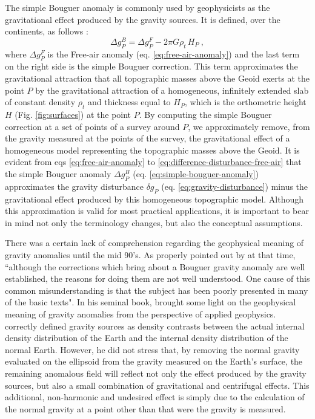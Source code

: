 \documentclass[extra]{gji}
\begin{document}
The simple Bouguer anomaly is commonly used by geophysicists as the
gravitational effect produced by the gravity sources.
It is defined, over the continents, as follows
\citep{blakely1996, hofmann-wellenhof-moritz2005}:
\begin{equation}
\Delta g_{P}^{B}
= \Delta g_{P}^{F} - 2 \pi G \rho_{t} \, H_{P} \: ,
\label{eq:simple-bouguer-anomaly}
\end{equation}
where $\Delta g_{P}^{F}$ is the Free-air anomaly (eq. \ref{eq:free-air-anomaly})
and the last term on the right side is the simple Bouguer correction.
This term approximates the gravitational attraction that all topographic
masses above the Geoid exerts at the point $P$ by the gravitational
attraction of a homogeneous, infinitely extended slab of
constant density $\rho_{t}$ and thickness equal to $H_{P}$, which is
the orthometric height $H$ (Fig. \ref{fig:surfaces}) at the point $P$.
By computing the simple Bouguer correction at a set of points
of a survey around $P$, we approximately remove,
from the gravity measured at the points of the survey,
the gravitational effect of a homogeneous model representing
the topographic masses above the Geoid.
It is evident from eqs
\ref{eq:free-air-anomaly} to \ref{eq:difference-disturbance-free-air}
that the simple Bouguer anomaly $\Delta g_{P}^{B}$ (eq.
\ref{eq:simple-bouguer-anomaly}) approximates the gravity disturbance
$\delta g_{P}$ (eq. \ref{eq:gravity-disturbance})
minus the gravitational effect produced by this homogeneous topographic
model.
Although this approximation is valid for most practical applications,
it is important to bear in mind not only the terminology
changes, but also the conceptual assumptions.

There was a certain lack of comprehension regarding the
geophysical meaning of gravity anomalies until the
mid 90's.
As properly pointed out by \citet{chapin1996} at that time,
``although the corrections which bring about a Bouguer
gravity anomaly are well established, the reasons for doing
them are not well understood. One cause of this common
misunderstanding is that the subject has been poorly presented in
many of the basic texts".
In his seminal book, \citet{blakely1996} brought some light
on the geophysical meaning of gravity anomalies from the
perspective of applied geophysics. \citet{blakely1996} correctly
defined gravity sources as density contrasts between the actual
internal density distribution of the Earth and the internal density
distribution of the normal Earth.
However, he did not stress that, by removing the normal gravity
evaluated on the ellipsoid from the gravity measured
on the Earth's surface, the remaining anomalous field will reflect
not only the effect produced by the gravity sources, but also a
small combination of gravitational and centrifugal effects.
This additional, non-harmonic and undesired effect is
simply due to the calculation of the normal gravity at a point
other than that were the gravity is measured.
\end{document}
